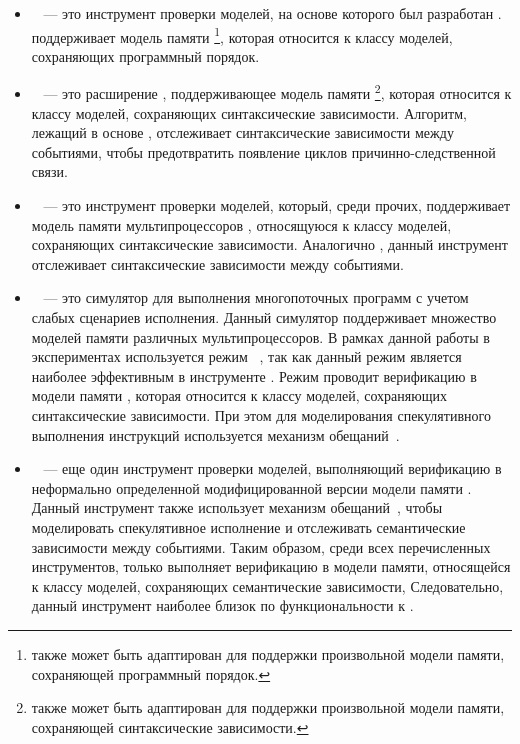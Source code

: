 \begin{itemize}

  \item \genmc~\cite{Kokologiannakis:PLDI2019,Kokologiannakis:CAD2021} ---
    это инструмент проверки моделей, на основе которого был разработан \wmc. 
    \genmc поддерживает модель памяти \RCMM%
    \footnote{\genmc также может быть адаптирован для поддержки 
    произвольной модели памяти, сохраняющей программный порядок.}, 
    которая относится к классу моделей, сохраняющих программный порядок.  

  \item \hmc~\cite{Kokologiannakis-Vafeiadis:ASPLOS2020} --- 
    это расширение \genmc, поддерживающее модель памяти \IMM
    \footnote{\hmc также может быть адаптирован для поддержки 
    произвольной модели памяти, сохраняющей синтаксические зависимости.},
    которая относится к классу моделей, сохраняющих синтаксические зависимости.  
    Алгоритм, лежащий в основе \hmc, отслеживает синтаксические зависимости между событиями, 
    чтобы предотвратить появление циклов причинно-следственной связи. 

  \item \Nidhugg~\cite{Abdulla-al:TACAS2015,Abdulla-al:CAV2016} --- 
    это инструмент проверки моделей, который, среди прочих, 
    поддерживает модель памяти мультипроцессоров \POWER, 
    относящуюся к классу моделей, сохраняющих синтаксические зависимости.  
    Аналогично \hmc, данный инструмент отслеживает синтаксические зависимости между событиями.

  \item \rmem~\cite{RMEM} --- 
    это симулятор для выполнения многопоточных программ с учетом слабых сценариев исполнения. 
    Данный симулятор поддерживает множество моделей памяти различных мультипроцессоров. 
    В рамках данной работы в экспериментах используется режим \PrmARM%
    ~\cite{Pulte-al:PLDI2019}, так как данный режим является 
    наиболее эффективным в инструменте \rmem.
    Режим \PrmARM проводит верификацию в модели памяти , 
    которая относится к классу моделей, сохраняющих синтаксические зависимости. 
    При этом для моделирования спекулятивного выполнения инструкций 
    используется механизм обещаний~\cite{Kang-al:POPL17}.  

  \item \CDSChecker~\cite{Norris-Demsky:OOPSLA2013} --- 
    еще один инструмент проверки моделей, выполняющий верификацию 
    в неформально определенной модифицированной версии модели памяти \CMM.
    Данный инструмент также использует механизм обещаний~\cite{Kang-al:POPL17}, 
    чтобы моделировать спекулятивное исполнение и отслеживать
    семантические зависимости между событиями. 
    Таким образом, среди всех перечисленных инструментов,
    только \CDSChecker выполняет верификацию в модели памяти, 
    относящейся к классу моделей, сохраняющих семантические зависимости, 
    Следовательно, данный инструмент наиболее близок по функциональности к \wmc.

\end{itemize}

